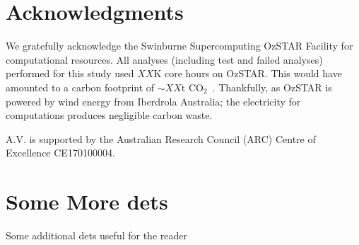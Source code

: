 \documentclass[floatfix,ApJL,twocolumn]{aastex631}
\begin{document}
\section*{Acknowledgments}{


We gratefully acknowledge the Swinburne Supercomputing OzSTAR Facility for computational resources. All analyses (including test and failed analyses) performed for this study used $XX$K core hours on OzSTAR. This would have amounted to a carbon footprint of ${\sim XX{\text{t CO}_2}}$~\citep{greenhouse, energy_to_co2_converter}. Thankfully, as OzSTAR is powered by wind energy from Iberdrola Australia; the electricity for computations produces negligible carbon waste.


A.V. is supported by the Australian Research Council (ARC) Centre of Excellence CE170100004.

}

\vspace{5mm}



{}


\appendix

\section{Some More dets}\label{apdx:dets}
Some additional dets useful for the reader
\end{document}
